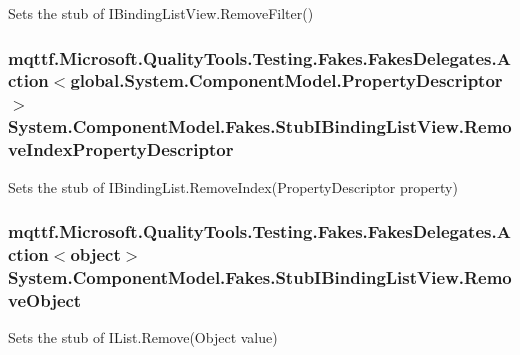 Sets the stub of I\-Binding\-List\-View.\-Remove\-Filter()

\hypertarget{class_system_1_1_component_model_1_1_fakes_1_1_stub_i_binding_list_view_a2183a91cb5f853bc92a4718ca1e4e4b1}{
\subsubsection[{Remove\-Index\-Property\-Descriptor}]{\setlength{\rightskip}{0pt plus 5cm}mqttf.\-Microsoft.\-Quality\-Tools.\-Testing.\-Fakes.\-Fakes\-Delegates.\-Action$<$global.\-System.\-Component\-Model.\-Property\-Descriptor$>$ System.\-Component\-Model.\-Fakes.\-Stub\-I\-Binding\-List\-View.\-Remove\-Index\-Property\-Descriptor}}\label{class_system_1_1_component_model_1_1_fakes_1_1_stub_i_binding_list_view_a2183a91cb5f853bc92a4718ca1e4e4b1}


Sets the stub of I\-Binding\-List.\-Remove\-Index(\-Property\-Descriptor property)

\hypertarget{class_system_1_1_component_model_1_1_fakes_1_1_stub_i_binding_list_view_a52741de6b144fa468048a244bdeb375b}{
\subsubsection[{Remove\-Object}]{\setlength{\rightskip}{0pt plus 5cm}mqttf.\-Microsoft.\-Quality\-Tools.\-Testing.\-Fakes.\-Fakes\-Delegates.\-Action$<$object$>$ System.\-Component\-Model.\-Fakes.\-Stub\-I\-Binding\-List\-View.\-Remove\-Object}}\label{class_system_1_1_component_model_1_1_fakes_1_1_stub_i_binding_list_view_a52741de6b144fa468048a244bdeb375b}


Sets the stub of I\-List.\-Remove(\-Object value)

